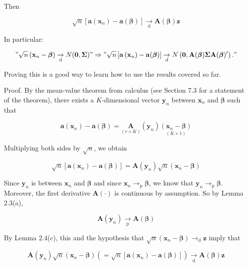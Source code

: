 \documentclass[10pt]{article}
\begin{document}
Then

$$
\sqrt{n}\left[\mathbf{a}\left(\mathbf{x}_{n}\right)-\mathbf{a}(\boldsymbol{\beta})\right] \underset{\mathrm{d}}{\rightarrow} \mathbf{A}(\boldsymbol{\beta}) \mathbf{z}
$$

In particular:

$$
" \sqrt{n}\left(\mathbf{x}_{n}-\boldsymbol{\beta}\right) \underset{\mathrm{d}}{\rightarrow} N(\mathbf{0}, \boldsymbol{\Sigma}) " \Rightarrow " \sqrt{n}\left[\mathbf{a}\left(\mathbf{x}_{n}\right)-\mathbf{a}(\boldsymbol{\beta})\right] \underset{\mathrm{d}}{\rightarrow} N\left(\mathbf{0}, \mathbf{A}(\boldsymbol{\beta}) \boldsymbol{\Sigma} \mathbf{A}(\boldsymbol{\beta})^{\prime}\right) . "
$$

Proving this is a good way to learn how to use the results covered so far.

Proof. By the mean-value theorem from calculus (see Section 7.3 for a statement of the theorem), there exists a $K$-dimensional vector $\mathbf{y}_{n}$ between $\mathbf{x}_{n}$ and $\boldsymbol{\beta}$ such that

$$
\mathbf{a}\left(\mathbf{x}_{n}\right)-\mathbf{a}(\boldsymbol{\beta})=\underset{(r \times K)}{\mathbf{A}}\left(\mathbf{y}_{n}\right) \underset{(K \times 1)}{\left(\mathbf{x}_{n}-\boldsymbol{\beta}\right)}
$$

Multiplying both sides by $\sqrt{n}$, we obtain

$$
\sqrt{n}\left[\mathbf{a}\left(\mathbf{x}_{n}\right)-\mathbf{a}(\boldsymbol{\beta})\right]=\mathbf{A}\left(\mathbf{y}_{n}\right) \sqrt{n}\left(\mathbf{x}_{n}-\boldsymbol{\beta}\right)
$$

Since $\mathbf{y}_{n}$ is between $\mathbf{x}_{n}$ and $\boldsymbol{\beta}$ and since $\mathbf{x}_{n} \rightarrow_{\mathrm{p}} \boldsymbol{\beta}$, we know that $\mathbf{y}_{n} \rightarrow_{\mathrm{p}} \boldsymbol{\beta}$. Moreover, the first derivative $\mathbf{A}(\cdot)$ is continuous by assumption. So by Lemma 2.3(a),

$$
\mathbf{A}\left(\mathbf{y}_{n}\right) \underset{\mathrm{p}}{\rightarrow} \mathbf{A}(\boldsymbol{\beta})
$$

By Lemma 2.4(c), this and the hypothesis that $\sqrt{n}\left(\mathbf{x}_{n}-\boldsymbol{\beta}\right) \rightarrow_{\mathrm{d}} \mathbf{z}$ imply that

$$
\mathbf{A}\left(\mathbf{y}_{n}\right) \sqrt{n}\left(\mathbf{x}_{n}-\boldsymbol{\beta}\right)\left(=\sqrt{n}\left[\mathbf{a}\left(\mathbf{x}_{n}\right)-\mathbf{a}(\boldsymbol{\beta})\right]\right) \underset{\mathrm{d}}{\rightarrow} \mathbf{A}(\boldsymbol{\beta}) \mathbf{z}
$$
\end{document}
